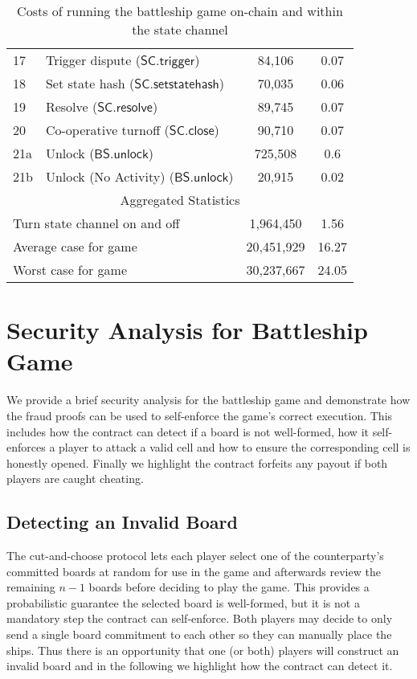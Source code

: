 \documentclass{llncs}
\newcommand{\statechanneldispute}{\mathsf{SC}.\mathsf{trigger}}
\newcommand{\statechannelsetstate}{\mathsf{SC}.\mathsf{setstatehash}}
\newcommand{\statechannelresolve}{\mathsf{SC}.\mathsf{resolve}}
\newcommand{\statechannelclose}{\mathsf{SC}.\mathsf{close}}
\newcommand{\battleshipunlock}{\mathsf{BS.unlock}}
\begin{document}
\begin{table}
\begin{tabular}[]{l l c c}
		17 & Trigger dispute ($\statechanneldispute$) & 84,106 & 0.07\\
		18 & Set state hash ($\statechannelsetstate$) & 70,035 & 0.06 \\
		19 & Resolve ($\statechannelresolve$) &89,745 & 0.07 \\
		20 & Co-operative turnoff ($\statechannelclose$) & 90,710 & 0.07 \\
		21a & Unlock ($\battleshipunlock$) & 725,508 & 0.6 \\
		21b & Unlock (No Activity) ($\battleshipunlock$) & 20,915 & 0.02 \\
		\hline
		\multicolumn{4}{c}{Aggregated Statistics} \\
		\hline
		\multicolumn{2}{l}{Turn state channel on and off} & 1,964,450  & 1.56 \\
		\multicolumn{2}{l}{Average case for game} & 20,451,929 & 16.27 \\
		\multicolumn{2}{l}{Worst case for game} & 30,237,667 & 24.05 \\
		\hline 
	\end{tabular}
	
	\caption{Costs of running the battleship game on-chain and within the state channel}\label{tab:costs}
\end{table}



\section{Security Analysis for Battleship Game} \label{sec:secanalysis}

We provide a brief security analysis for the battleship game and demonstrate how the fraud proofs can be used to self-enforce the game's correct execution.
This includes how the contract can detect if a board is not well-formed, how it self-enforces a player to attack a valid cell and how to ensure the corresponding cell is honestly opened. 
Finally we highlight the contract forfeits any payout if both players are caught cheating. 

\subsection{Detecting an Invalid Board}

The cut-and-choose protocol lets each player select one of the counterparty's committed boards at random for use in the game and afterwards review the remaining $n-1$ boards before deciding to play the game. 
This provides a probabilistic guarantee the selected board is well-formed, but it is not a mandatory step the contract can self-enforce. 
Both players may decide to only send a single board commitment to each other so they can manually place the ships. 
Thus there is an opportunity that one (or both) players will construct an invalid board and in the following we highlight how the contract can detect it.  
\end{document}
